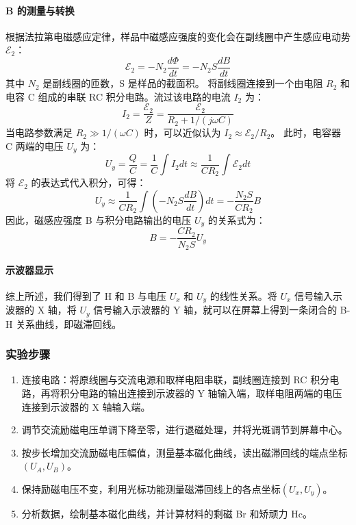 \documentclass[]{../template/Report}%
\begin{document}
\paragraph{B 的测量与转换}
根据法拉第电磁感应定律，样品中磁感应强度的变化会在副线圈中产生感应电动势 $\mathcal{E}_2$：
\begin{equation}
    \mathcal{E}_2 = -N_2 \frac{d\Phi}{dt} = -N_2 S \frac{dB}{dt}
\end{equation}
其中 $N_2$ 是副线圈的匝数，S 是样品的截面积。
将副线圈连接到一个由电阻 $R_2$ 和电容 C 组成的串联 RC 积分电路。流过该电路的电流 $I_2$ 为：
\begin{equation}
    I_2 = \frac{\mathcal{E}_2}{Z} = \frac{\mathcal{E}_2}{R_2 + 1/(j\omega C)}
\end{equation}
当电路参数满足 $R_2 \gg 1/(\omega C)$ 时，可以近似认为 $I_2 \approx \mathcal{E}_2 / R_2$。
此时，电容器 C 两端的电压 $U_y$ 为：
\begin{equation}
    U_y = \frac{Q}{C} = \frac{1}{C} \int I_2 dt \approx \frac{1}{CR_2} \int \mathcal{E}_2 dt
\end{equation}
将 $\mathcal{E}_2$ 的表达式代入积分，可得：
\begin{equation}
    U_y \approx \frac{1}{CR_2} \int \left(-N_2 S \frac{dB}{dt}\right) dt = -\frac{N_2 S}{C R_2} B
\end{equation}
因此，磁感应强度 B 与积分电路输出的电压 $U_y$ 的关系式为：
\begin{equation}
    \boxed{B = -\frac{C R_2}{N_2 S} U_y}
\end{equation}

\paragraph{示波器显示}
综上所述，我们得到了 H 和 B 与电压 $U_x$ 和 $U_y$ 的线性关系。将 $U_x$ 信号输入示波器的 X 轴，将 $U_y$ 信号输入示波器的 Y 轴，就可以在屏幕上得到一条闭合的 B-H 关系曲线，即磁滞回线。

\subsubsection{实验步骤}
\begin{enumerate}
    \item 连接电路：将原线圈与交流电源和取样电阻串联，副线圈连接到 RC 积分电路，再将积分电路的输出连接到示波器的 Y 轴输入端，取样电阻两端的电压连接到示波器的 X 轴输入端。
    \item 调节交流励磁电压单调下降至零，进行退磁处理，并将光斑调节到屏幕中心。
    \item 按步长增加交流励磁电压幅值，测量基本磁化曲线，读出磁滞回线的端点坐标$(U_A, U_B)$。
    \item 保持励磁电压不变，利用光标功能测量磁滞回线上的各点坐标$(U_x, U_y)$。
    \item 分析数据，绘制基本磁化曲线，并计算材料的剩磁 Br 和矫顽力 Hc。
\end{enumerate}
\end{document}
